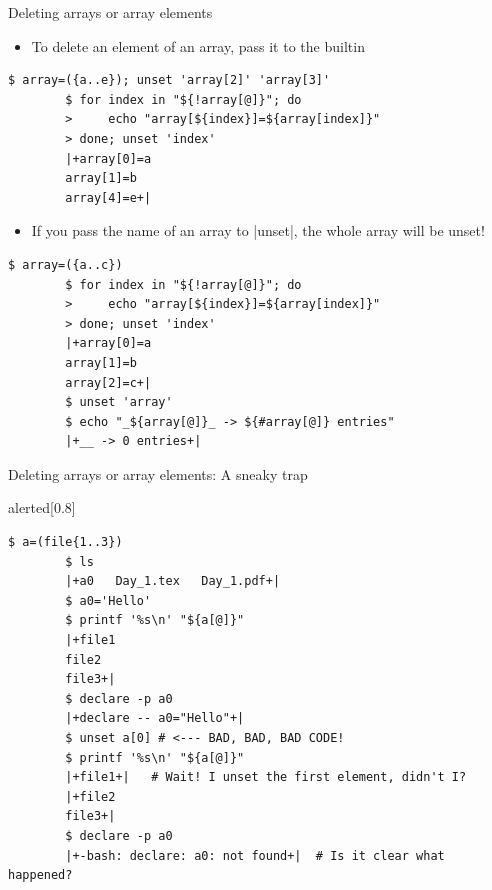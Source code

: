 \begin{frame}[fragile]{Deleting arrays or array elements}
    \vspace{-3mm}
    \begin{itemize}
        \item To delete an element of an array, pass it to the  builtin
    \end{itemize}
    \begin{lstlisting}[style=MyBash, belowskip=-5mm]
        $ array=({a..e}); unset 'array[2]' 'array[3]'
        $ for index in "${!array[@]}"; do
        >     echo "array[${index}]=${array[index]}"
        > done; unset 'index'
        |+array[0]=a
        array[1]=b
        array[4]=e+|
    \end{lstlisting}
    \begin{itemize}
        \item If you pass the name of an array to \bash|unset|, the whole array will be unset!
    \end{itemize}
    \begin{lstlisting}[style=MyBash]
        $ array=({a..c})
        $ for index in "${!array[@]}"; do
        >     echo "array[${index}]=${array[index]}"
        > done; unset 'index'
        |+array[0]=a
        array[1]=b
        array[2]=c+|
        $ unset 'array'
        $ echo "_${array[@]}_ -> ${#array[@]} entries"
        |+__ -> 0 entries+|
    \end{lstlisting}
\end{frame}
\begin{frame}[fragile]{Deleting arrays or array elements: A sneaky trap}
    \vspace{-1mm}
    \begin{varblock}{alerted}[0.8\textwidth]{}
        \large {}
    \end{varblock}
    \begin{lstlisting}[style=MyBash, emph={[7]a, a0}]
        $ a=(file{1..3})
        $ ls
        |+a0   Day_1.tex   Day_1.pdf+|
        $ a0='Hello'
        $ printf '%s\n' "${a[@]}"
        |+file1
        file2
        file3+|
        $ declare -p a0
        |+declare -- a0="Hello"+|
        $ unset a[0] # <--- BAD, BAD, BAD CODE!
        $ printf '%s\n' "${a[@]}"
        |+file1+|   # Wait! I unset the first element, didn't I?
        |+file2
        file3+|
        $ declare -p a0
        |+-bash: declare: a0: not found+|  # Is it clear what happened?
    \end{lstlisting}
\end{frame}
